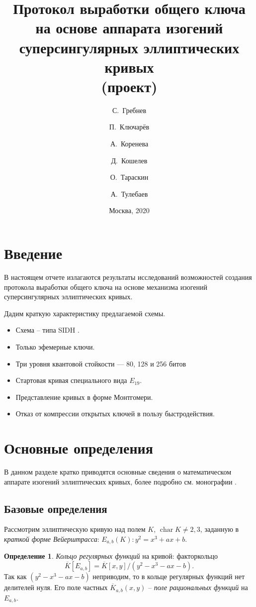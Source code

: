 \documentclass[a4paper,12pt]{article}
\title{ Протокол выработки общего ключа на основе аппарата изогений суперсингулярных эллиптических кривых \\(проект)}
\author[1]{С.~Гребнев}
\author[2]{П.~Ключарёв}
\author[3]{А.~Коренева}
\author[4]{Д.~Кошелев}
\author[5]{О.~Тараскин}
\author[3]{А.~Тулебаев}
\affil[1]{QAPP}
\affil[2]{МГТУ им.~Н.Э.~Баумана}
\affil[3]{Код безопасности}
\affil[4]{ИнфоТеКС}
\affil[5]{Waves}
\date{Москва, 2020}
\DeclareMathOperator{\Char}{char}
\theoremstyle{definition}
\newtheorem{definition}{Определение}
\renewcommand{\baselinestretch}{1.35}
\begin{document}
 

\maketitle
\newpage
\tableofcontents
\newpage

\renewcommand{\baselinestretch}{1.35}\large
\section*{Введение}

В настоящем  отчете излагаются  результаты исследований возможностей создания протокола выработки общего ключа   на основе механизма изогений суперсингулярных эллиптических кривых. 

Дадим краткую характеристику предлагаемой схемы.

 \begin{itemize}
  \item Схема -- типа SIDH \cite{DF}.
  \item Только эфемерные ключи.
  \item Три уровня квантовой стойкости --- 80, 128 и 256 битов
  \item Стартовая кривая специального вида $E_{19}$.
  \item Представление кривых в форме Монтгомери. 
  \item Отказ от компрессии открытых ключей в пользу быстродействия.
 \end{itemize}


\section{Основные определения}

В данном разделе кратко приводятся основные сведения о математическом аппарате изогений эллиптических кривых, более подробно см.  монографии \cite{Silverman, Wash}.

\subsection{Базовые определения}

Рассмотрим эллиптическую кривую над  полем $K$, $\Char K\neq2,3$, заданную в \emph{краткой форме Вейерштрасса}: $E_{a,b}(K): y^2=x^3+ax+b$.

\begin{definition}
\emph{Кольцо регулярных функций} на кривой: факторкольцо $$\overline{K}[E_{a,b}]=\overline{K}[x,y]/(y^2-x^3-ax-b).$$
Так как $(y^2-x^3-ax-b)$ неприводим, то в кольце регулярных функций нет делителей нуля.
Его поле частных $\overline{K}_{a,b}(x,y)$ -- \emph{поле рациональных функций} на $E_{a,b}$.
\end{definition}
\end{document}
